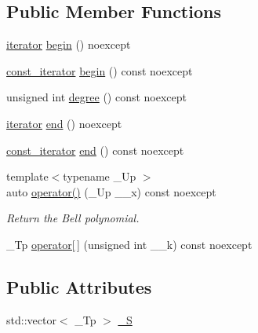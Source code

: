 \subsection*{Public Member Functions}
\begin{DoxyCompactItemize}
\item 
\hyperlink{struct____gnu__cxx_1_1____stirling__2__t_aa7fda155fac4d993df6fc7deb4a66e84}{iterator} \hyperlink{struct____gnu__cxx_1_1____stirling__2__t_ad4db5efb6fff1c30da5632caaf320b5b}{begin} () noexcept
\item 
\hyperlink{struct____gnu__cxx_1_1____stirling__2__t_a1de3af89467d37bd2d1f1228186c08e8}{const\+\_\+iterator} \hyperlink{struct____gnu__cxx_1_1____stirling__2__t_a08a6d69b6eb583c6cb60ea3d05e24b97}{begin} () const noexcept
\item 
unsigned int \hyperlink{struct____gnu__cxx_1_1____stirling__2__t_aba71844786b83ff8b5b8eba1518d2d47}{degree} () const noexcept
\item 
\hyperlink{struct____gnu__cxx_1_1____stirling__2__t_aa7fda155fac4d993df6fc7deb4a66e84}{iterator} \hyperlink{struct____gnu__cxx_1_1____stirling__2__t_a51753a61e57621c59b33cd5801ba35e0}{end} () noexcept
\item 
\hyperlink{struct____gnu__cxx_1_1____stirling__2__t_a1de3af89467d37bd2d1f1228186c08e8}{const\+\_\+iterator} \hyperlink{struct____gnu__cxx_1_1____stirling__2__t_a4ff9005c06ea578ee331689a08ab0f45}{end} () const noexcept
\item 
{\footnotesize template$<$typename \+\_\+\+Up $>$ }\\auto \hyperlink{struct____gnu__cxx_1_1____stirling__2__t_adae1c28a6bb1a10b483280ab755dea2b}{operator()} (\+\_\+\+Up \+\_\+\+\_\+x) const noexcept
\begin{DoxyCompactList}\small\item\em Return the Bell polynomial. \end{DoxyCompactList}\item 
\+\_\+\+Tp \hyperlink{struct____gnu__cxx_1_1____stirling__2__t_afec14221335ce01ffbf73645a083fb36}{operator\mbox{[}$\,$\mbox{]}} (unsigned int \+\_\+\+\_\+k) const noexcept
\end{DoxyCompactItemize}
\subsection*{Public Attributes}
\begin{DoxyCompactItemize}
\item 
std\+::vector$<$ \+\_\+\+Tp $>$ \hyperlink{struct____gnu__cxx_1_1____stirling__2__t_aaae5f39d3a7053cac92eb0541440817f}{\+\_\+S}
\end{DoxyCompactItemize}


